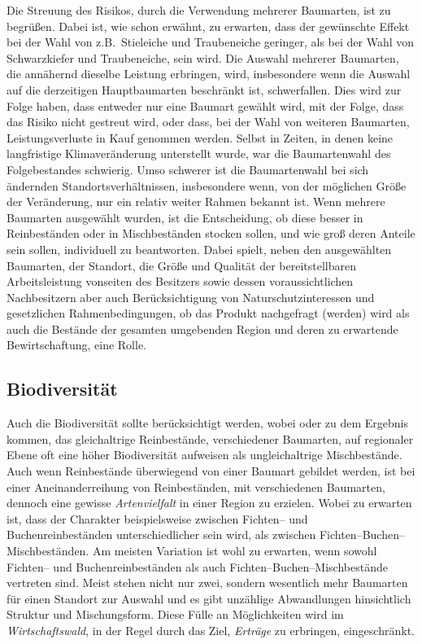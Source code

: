 \documentclass[twocolumn]{scrartcl}
\begin{document}
Die Streuung des Risikos, durch die Verwendung mehrerer Baumarten, ist zu
begrüßen. Dabei ist, wie schon erwähnt, zu erwarten, dass der gewünschte Effekt
bei der Wahl von z.B.\ Stieleiche und Traubeneiche geringer, als bei der Wahl
von Schwarzkiefer und Traubeneiche, sein wird. Die Auswahl mehrerer Baumarten,
die annähernd dieselbe Leistung erbringen, wird, insbesondere wenn die Auswahl
auf die derzeitigen Hauptbaumarten beschränkt ist, schwerfallen. Dies wird zur
Folge haben, dass entweder nur eine Baumart gewählt wird, mit der Folge, dass
das Risiko nicht gestreut wird, oder dass, bei der Wahl von weiteren Baumarten,
Leistungsverluste in Kauf genommen werden. Selbst in Zeiten, in denen keine
langfristige Klimaveränderung unterstellt wurde, war die Baumartenwahl des
Folgebestandes schwierig. Umso schwerer ist die Baumartenwahl bei sich ändernden
Standortsverhältnissen, insbesondere wenn, von der möglichen Größe der
Veränderung, nur ein relativ weiter Rahmen bekannt ist. Wenn mehrere Baumarten
ausgewählt wurden, ist die Entscheidung, ob diese besser in Reinbeständen oder
in Mischbeständen stocken sollen, und wie groß deren Anteile sein sollen,
individuell zu beantworten. Dabei spielt, neben den ausgewählten Baumarten, der
Standort, die Größe und Qualität der bereitstellbaren Arbeitsleistung vonseiten
des Besitzers sowie dessen voraussichtlichen Nachbesitzern aber auch
Berücksichtigung von Naturschutzinteressen und gesetzlichen Rahmenbedingungen,
ob das Produkt nachgefragt (werden) wird als auch die Bestände der gesamten
umgebenden Region und deren zu erwartende Bewirtschaftung, eine Rolle.

\subsection{Biodiversität}
\label{ssec:biodiversitaet}

Auch die Biodiversität sollte berücksichtigt werden, wobei
\cite{heinrichs2019Reinbestand} oder \cite{schall2017Reinbestand} zu
dem Ergebnis kommen, das gleichaltrige Reinbestände, verschiedener
Baumarten, auf regionaler Ebene oft eine höher Biodiversität aufweisen
als ungleichaltrige Mischbestände. Auch wenn Reinbestände überwiegend
von einer Baumart gebildet werden, ist bei einer Aneinanderreihung von
Reinbeständen, mit verschiedenen Baumarten, dennoch eine gewisse
\emph{Artenvielfalt} in einer Region zu erzielen. Wobei zu erwarten
ist, dass der Charakter beispielsweise zwischen Fichten-- und
Buchenreinbeständen unterschiedlicher sein wird, als zwischen
Fichten--Buchen--Mischbeständen. Am meisten Variation ist wohl zu
erwarten, wenn sowohl Fichten-- und Buchenreinbeständen als auch
Fichten--Buchen--Mischbestände vertreten sind. Meist stehen nicht nur
zwei, sondern wesentlich mehr Baumarten für einen Standort zur Auswahl
und es gibt unzählige Abwandlungen hinsichtlich Struktur und
Mischungsform. Diese Fülle an Möglichkeiten wird im
\emph{Wirtschaftswald}, in der Regel durch das Ziel, \emph{Erträge} zu
erbringen, eingeschränkt.
\end{document}
